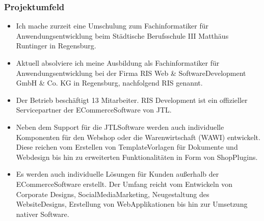 \documentclass[a4paper,12pt,ngerman]{sphinxmanual}
\begin{document}
\subsubsection{Projektumfeld}
\label{\detokenize{sections/projektplanung_analyse:projektumfeld}}\begin{itemize}
\item {} 
\sphinxAtStartPar
Ich mache zurzeit eine Umschulung zum Fachinformatiker für Anwendungsentwicklung beim Städtische Berufsschule III Matthäus Runtinger in Regensburg.

\item {} 
\sphinxAtStartPar
Aktuell absolviere ich meine Ausbildung als Fachinformatiker für Anwendungsentwicklung bei der Firma RIS Web\sphinxhyphen{} \& Software\sphinxhyphen{}Development GmbH \& Co. KG in Regensburg, nachfolgend RIS genannt.

\item {} 
\sphinxAtStartPar
Der Betrieb beschäftigt 13 Mitarbeiter. RIS Development ist ein offizieller Servicepartner der E\sphinxhyphen{}Commerce\sphinxhyphen{}Software von JTL.

\item {} 
\sphinxAtStartPar
Neben dem Support für die JTL\sphinxhyphen{}Software werden auch individuelle Komponenten für den Webshop oder die Warenwirtschaft (WAWI) entwickelt. Diese reichen vom Erstellen von Template\sphinxhyphen{}Vorlagen für Dokumente und Webdesign bis hin zu erweiterten Funktionalitäten in Form von Shop\sphinxhyphen{}Plugins.

\item {} 
\sphinxAtStartPar
Es werden auch individuelle Lösungen für Kunden außerhalb der E\sphinxhyphen{}Commerce\sphinxhyphen{}Software erstellt. Der Umfang reicht vom Entwickeln von Corporate Designs, Social\sphinxhyphen{}Media\sphinxhyphen{}Marketing, Neugestaltung des Website\sphinxhyphen{}Designs, Erstellung von Web\sphinxhyphen{}Applikationen bis hin zur Umsetzung nativer Software.

\end{itemize}
\end{document}
